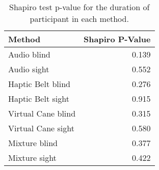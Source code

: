 
\begin{table}[!htb]
\centering
\caption{Shapiro test p-value for the duration of participant in each method.}
\label{tab:shapiro_duration}
\begin{tabular}{lr}
\toprule
            Method &  Shapiro P-Value \\
\midrule
       Audio blind &            0.139 \\
       Audio sight &            0.552 \\
 Haptic Belt blind &            0.276 \\
 Haptic Belt sight &            0.915 \\
Virtual Cane blind &            0.315 \\
Virtual Cane sight &            0.580 \\
     Mixture blind &            0.377 \\
     Mixture sight &            0.422 \\
\bottomrule
\end{tabular}
\end{table}

